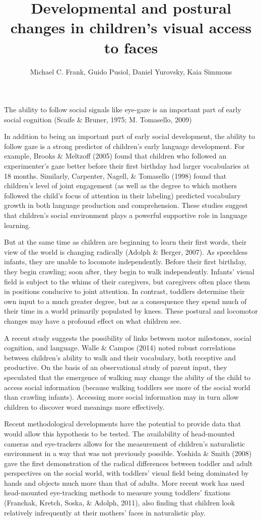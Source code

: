 \documentclass[a4paper,man,apacite,floatsintext,longtable]{apa6}
\date{}
\title{\textbf{Developmental and postural changes in children's visual access to faces}}
\author{Michael C. Frank, Guido Pusiol, Daniel Yurovsky, Kaia Simmons}
\affiliation{Department of Psychology, Stanford University}
\begin{document}
\maketitle

The ability to follow social signals like eye-gaze is an important part
of early social cognition (Scaife \& Bruner, 1975; M. Tomasello, 2009)

In addition to being an important part of early social development, the
ability to follow gaze is a strong predictor of children's early
language development. For example, Brooks \& Meltzoff (2005) found that
children who followed an experimenter's gaze better before their first
birthday had larger vocabularies at 18 months. Similarly, Carpenter,
Nagell, \& Tomasello (1998) found that children's level of joint
engagement (as well as the degree to which mothers followed the child's
focus of attention in their labeling) predicted vocabulary growth in
both language production and comprehension. These studies suggest that
children's social environment plays a powerful supportive role in
language learning.

But at the same time as children are beginning to learn their first
words, their view of the world is changing radically (Adolph \& Berger,
2007). As speechless infants, they are unable to locomote independently.
Before their first birthday, they begin crawling; soon after, they begin
to walk independently. Infants' visual field is subject to the whims of
their caregivers, but caregivers often place them in positions conducive
to joint attention. In contrast, toddlers determine their own input to a
much greater degree, but as a consequence they spend much of their time
in a world primarily populated by knees. These postural and locomotor
changes may have a profound effect on what children see.

A recent study suggests the possibility of links between motor
milestones, social cognition, and language. Walle \& Campos (2014) noted
robust correlations between children's ability to walk and their
vocabulary, both receptive and productive. On the basis of an
observational study of parent input, they speculated that the emergence
of walking may change the ability of the child to access social
information (because walking toddlers see more of the social world than
crawling infants). Accessing more social information may in turn allow
children to discover word meanings more effectively.

Recent methodological developments have the potential to provide data
that would allow this hypothesis to be tested. The availability of
head-mounted cameras and eye-trackers allows for the measurement of
children's naturalistic environment in a way that was not previously
possible. Yoshida \& Smith (2008) gave the first demonstration of the
radical differences between toddler and adult perspectives on the social
world, with toddlers' visual field being dominated by hands and objects
much more than that of adults. More recent work has used head-mounted
eye-tracking methods to measure young toddlers' fixations (Franchak,
Kretch, Soska, \& Adolph, 2011), also finding that children look
relatively infrequently at their mothers' faces in naturalistic play.
\end{document}
